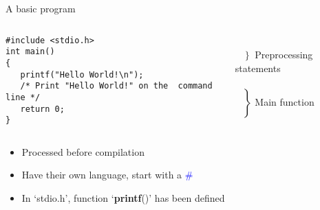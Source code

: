 \begin{frame}[fragile]{A basic program}
	\begin{columns}[T]
		\begin{lstlisting}
#include <stdio.h>
int main()
{
   printf("Hello World!\n");
   /* Print "Hello World!" on the  command line */
   return 0;
}
		\end{lstlisting}
		\ \\$\left. \begin{array}{c}\\\end{array}\right\rbrace $ Preprocessing statements
		\ \\\ \\$\left. \begin{array}{c}\\\\\\\\\\\\\end{array}\right\rbrace $ Main function
	\end{columns}
	\begin{itemize}
		\item {Processed before compilation}
		\item {Have their own language, start with a \textcolor{blue}{\#}}
		\item {In `stdio.h', function `\textbf{printf}()' has been defined}
	\end{itemize}
\end{frame}

